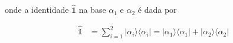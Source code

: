 \begin{prob}
		onde a identidade $\mathbb{\hat{1}}$ na base $\alpha_{1}$ e $\alpha_{2}$ é dada por

		\begin{align}
			\mathbb{\hat{1}} &= \sum_{i=1}^{2}|\alpha_{i}\rangle\langle \alpha_{i}|=|\alpha_{1}\rangle\langle \alpha_{1}|+|\alpha_{2}\rangle\langle \alpha_{2}|
		\end{align}
	\end{prob}
